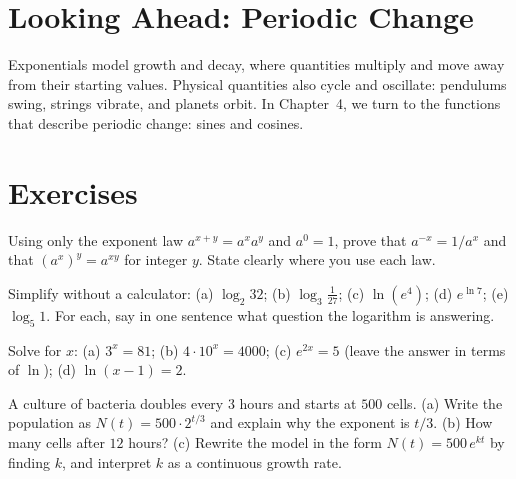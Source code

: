 \section{Looking Ahead: Periodic Change}
\label{ch03:looking-ahead}

Exponentials model growth and decay, where quantities multiply and move away from their starting values.
Physical quantities also cycle and oscillate: pendulums swing, strings vibrate, and planets orbit.
In Chapter~4, we turn to the functions that describe periodic change: sines and cosines.

\section{Exercises}

\begin{exercise}
\label{ch03:exc-laws}
Using only the exponent law $a^{x+y}=a^x a^y$ and $a^0=1$, prove that $a^{-x}=1/a^x$ and that $(a^x)^y = a^{xy}$ for integer $y$. State clearly where you use each law.
\end{exercise}

\begin{exercise}
\label{ch03:exc-eval-logs}
Simplify without a calculator: (a) $\log_2 32$; (b) $\log_3 \tfrac{1}{27}$; (c) $\ln(e^4)$; (d) $e^{\ln 7}$; (e) $\log_5 1$. For each, say in one sentence what question the logarithm is answering.
\end{exercise}

\begin{exercise}
\label{ch03:exc-solve-eqs}
Solve for $x$: (a) $3^{x}=81$; (b) $4\cdot 10^{x}=4000$; (c) $e^{2x}=5$ (leave the answer in terms of $\ln$); (d) $\ln(x-1)=2$.
\end{exercise}

\begin{exercise}
\label{ch03:exc-bacteria}
A culture of bacteria doubles every $3$ hours and starts at $500$ cells. (a) Write the population as $N(t)=500\cdot 2^{t/3}$ and explain why the exponent is $t/3$. (b) How many cells after $12$ hours? (c) Rewrite the model in the form $N(t)=500\,e^{kt}$ by finding $k$, and interpret $k$ as a continuous growth rate.
\end{exercise}

